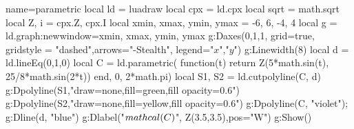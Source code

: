 \documentclass{standalone}%
\begin{document}
\begin{luadraw}{name=parametric}
local ld = luadraw
local cpx = ld.cpx
local sqrt = math.sqrt
local Z, i = cpx.Z, cpx.I
local xmin, xmax, ymin, ymax = -6, 6, -4, 4
local g = ld.graph:new{window={xmin, xmax, ymin, ymax}}  
g:Daxes({0,1,1}, {grid=true, gridstyle = "dashed",arrows="-Stealth", legend={"$x$","$y$"}})
g:Linewidth(8)
local d = ld.lineEq(0,1,0)
local C = ld.parametric( function(t) return Z(5*math.sin(t), 25/8*math.sin(2*t)) end, 0, 2*math.pi)
local S1, S2 = ld.cutpolyline(C, d)
g:Dpolyline(S1,"draw=none,fill=green,fill opacity=0.6")
g:Dpolyline(S2,"draw=none,fill=yellow,fill opacity=0.6")
g:Dpolyline(C, "violet"); g:Dline(d, "blue")
g:Dlabel("$\\mathcal{(C)}$", Z(3.5,3.5),{pos="W"})
g:Show()
\end{luadraw}
\end{document}
